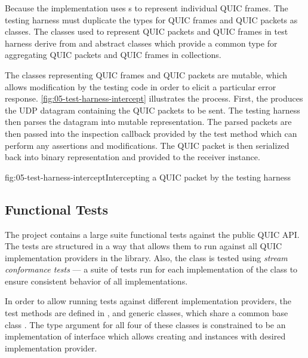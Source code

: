 Because the \ManagedQuicConnection{} implementation uses s to represent
individual QUIC frames. The testing harness must duplicate the types for QUIC frames and QUIC
packets as classes. The classes used to represent QUIC packets and QUIC frames in test harness
derive from  and  abstract classes which provide a common type
for aggregating QUIC packets and QUIC frames in collections.

The classes representing QUIC frames and QUIC packets are mutable, which allows modification by the
testing code in order to elicit a particular error response. \autoref{fig:05-test-harness-intercept}
illustrates the process. First, the \ManagedQuicConnection{} produces the UDP datagram containing
the QUIC packets to be sent. The testing harness then parses the datagram into mutable
representation. The parsed packets are then passed into the inspection callback provided by the test
method which can perform any assertions and modifications. The QUIC packet is then serialized back
into binary representation and provided to the receiver \ManagedQuicConnection{} instance.

\begin{myFigure}{fig:05-test-harness-intercept}{Intercepting a QUIC packet by the testing harness}

  \resizebox{\textwidth}{!}{}

\end{myFigure}

\subsection{Functional Tests}

The  project contains a large suite functional tests against the public
QUIC API. The tests are structured in a way that allows them to run against all QUIC implementation
providers in the library. Also, the \QuicStream{} class is tested using \textit{stream conformance
  tests} --- a suite of tests run for each implementation of the \Stream{} class to ensure consistent
behavior of all implementations.

In order to allow running tests against different implementation providers, the test methods are
defined in \QuicListenerTests{}, \QuicConnectionTests{} and \QuicStreamTests{} generic classes,
which share a common base class \QuicTestBase{}. The type argument for all four of these classes is
constrained to be an implementation of  interface which allows
creating \QuicListener{} and \QuicConnection{} instances with desired implementation provider.

